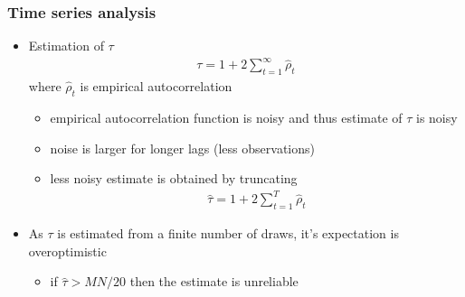 \documentclass[10pt,handout]{beamer}
\begin{document}
\begin{frame}

\frametitle{ Time series analysis}

  \begin{itemize}
  \item Estimation of $\tau$
    \begin{align*}
      \tau = 1 + 2 \sum_{t=1}^\infty \hat{\rho}_t
    \end{align*}
    where $\hat{\rho}_t$ is empirical autocorrelation
    \begin{itemize}
    \item<2-> empirical autocorrelation function is noisy and thus
      estimate of $\tau$ is noisy
    \item<2-> noise is larger for longer lags (less observations)
    \item<3-> less noisy estimate is obtained by truncating
    \begin{align*}
      \hat{\tau} = 1 + 2 \sum_{t=1}^T \hat{\rho}_t
    \end{align*}
    \end{itemize}
    \item<4-> As $\tau$ is estimated from a finite number of draws,
      it's expectation is overoptimistic
      \begin{itemize}
      \item if $\hat{\tau}>MN/20$ then the estimate is unreliable

      \end{itemize}
    \end{itemize}
\end{frame}
\end{document}
